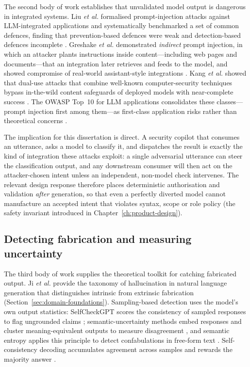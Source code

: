The second body of work establishes that unvalidated model output is dangerous
in integrated systems. Liu \emph{et al.} formalised prompt-injection attacks
against LLM-integrated applications and systematically benchmarked a set of
common defences, finding that prevention-based defences were weak and
detection-based defences incomplete \parencite{liu2023promptinjection}.
Greshake \emph{et al.} demonstrated \emph{indirect} prompt injection, in which
an attacker plants instructions inside content---including web pages and
documents---that an integration later retrieves and feeds to the model, and
showed compromise of real-world assistant-style integrations
\parencite{greshake2023indirect}. Kang \emph{et al.} showed that dual-use
attacks that combine well-known computer-security techniques bypass in-the-wild
content safeguards of deployed models with near-complete success
\parencite{kang2024dualuse}. The OWASP Top~10 for LLM applications
consolidates these classes---prompt injection first among them---as
first-class application risks rather than theoretical concerns
\parencite{owasp2025}.

The implication for this dissertation is direct. A security copilot that
consumes an utterance, asks a model to classify it, and dispatches the result
is exactly the kind of integration these attacks exploit: a single adversarial
utterance can steer the classification output, and any downstream consumer will
then act on the attacker-chosen intent unless an independent, non-model check
intervenes. The relevant design response therefore places deterministic
authorisation and validation \emph{after} generation, so that even a perfectly
diverted model cannot manufacture an accepted intent that violates syntax,
scope or role policy (the safety invariant introduced in
Chapter~\ref{ch:product-design}).

\subsection*{Detecting fabrication and measuring uncertainty}

The third body of work supplies the theoretical toolkit for catching fabricated
output. Ji \emph{et al.} provide the taxonomy of hallucination in natural
language generation that distinguishes intrinsic from extrinsic fabrication
\parencite{ji2023hallucination} (Section~\ref{sec:domain-foundations}).
Sampling-based detection uses the model's own output statistics:
SelfCheckGPT scores the consistency of sampled responses to flag ungrounded
claims \parencite{manakul2023selfcheckgpt}; semantic-uncertainty methods embed
responses and cluster meaning-equivalent outputs to measure disagreement
\parencite{kuhn2023semantic}, and semantic entropy applies this principle to
detect confabulations in free-form text \parencite{farquhar2024semantic}.
Self-consistency decoding accumulates agreement across samples and rewards the
majority answer \parencite{wang2023selfconsistency}.

